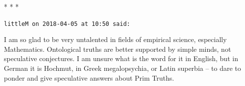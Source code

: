 
\begin{center}* * *\end{center}

\begin{footnotesize}
\begin{sffamily}
\texttt{littleM on 2018-04-05 at 10:50 said:}

I am so glad to be very untalented in fields of empirical science, especially Mathematics. Ontological truths are better supported by simple minds, not speculative conjectures. I am unsure what is the word for it in English, but in German it is Hochmut, in Greek megalopsychia, or Latin superbia -- to dare to ponder and give speculative answers about Prim Truths.

\end{sffamily}
\end{footnotesize}

